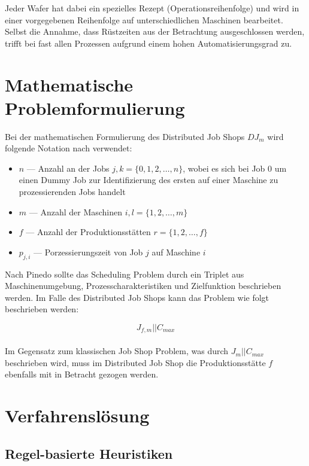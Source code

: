 \documentclass[final, english, ngerman, a4paper, 12pt, %
numbers=noenddot,
cd=true,
cdfont=false,cdfont=nohead,cdfont=nodin,
cdmath=false,
cdhead=false,
cdfoot=true,
cdcover=monochrome,
cdgeometry=symmetric,
declaration=heading,
declaration=notoc,
abstract=heading,
]{tudscrreprt}
\begin{document}
\noindent
Jeder Wafer hat dabei ein spezielles Rezept (Operationsreihenfolge) und wird in einer vorgegebenen Reihenfolge auf unterschiedlichen Maschinen bearbeitet. Selbst die Annahme, dass Rüstzeiten aus der Betrachtung ausgeschlossen werden, trifft bei fast allen Prozessen aufgrund einem hohen Automatisierungsgrad zu.


\chapter{Mathematische Problemformulierung}

Bei der mathematischen Formulierung des Distributed Job Shops $DJ_m$ wird folgende Notation nach \cite{pinedo-scheduling} verwendet:

\begin{itemize}
	\item $n$ — Anzahl an der Jobs $j,k = \{0,1,2,\ldots, n\}$, wobei es sich bei Job 0 um einen Dummy Job zur Identifizierung des ersten auf einer Maschine zu prozessierenden Jobs handelt
	\item $m$ — Anzahl der Maschinen $i, l = \{1, 2, \ldots, m\}$
	\item $f$ — Anzahl der Produktionsstätten $r = \{1, 2, \ldots, f\}$
	\item $p_{j,i}$ — Porzessierungszeit von Job $j$ auf Maschine $i$
\end{itemize}

\noindent
Nach Pinedo sollte das Scheduling Problem durch ein Triplet aus Maschinenumgebung, Prozesscharakteristiken und Zielfunktion beschrieben werden. Im Falle des Distributed Job Shops kann das Problem wie folgt beschrieben werden:

\begin{equation}
J_{f,m} | | C_{max}
\end{equation} \\

\noindent
Im Gegensatz zum klassischen Job Shop Problem, was durch $J_{m} | | C_{max}$ beschrieben wird, muss im Distributed Job Shop die Produktionsstätte $f$ ebenfalls mit in Betracht gezogen werden.

\chapter{Verfahrenslösung}
\section{Regel-basierte Heuristiken}
\end{document}
